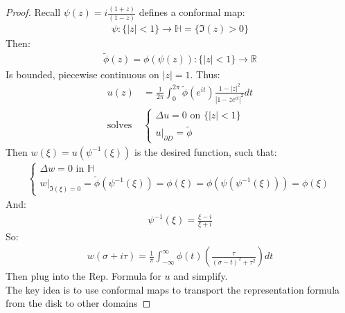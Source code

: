 \begin{proof}
    Recall $\psi (z) = i\frac{(1 +z)}{(1 - z)}$ defines a conformal map:
    \begin{align}
        \psi: \{|z| < 1\} \to \mathbb{H} = \{\Im (z) > 0\}
    \end{align}
    Then:
    \begin{align}
        \tilde{\phi}(z) = \phi(\psi(z)) : \{|z| < 1\} \to \mathbb{R}
    \end{align}
    Is bounded, piecewise continuous on $|z| = 1$. Thus:
    \begin{align*}
        u(z)           & = \frac{1}{2\pi}\int_{0}^{2\pi}\tilde{\phi}(e^{it})\frac{1 - |z|^2}{|1 - \overline{z}e^{it}|^2}dt \\
        \text{solves } & \begin{cases}
                             \Delta u = 0 \text{ on } \{|z| < 1\} \\
                             u|_{\partial D} = \tilde{\phi}
                         \end{cases}
    \end{align*}
    Then $w(\xi) = u(\psi^{-1}(\xi))$ is the desired function, such that:
    \begin{align}
        \begin{cases}
            \Delta w = 0 \text{ in } \mathbb{H} \\
            w|_{\Im (\xi) = 0} = \tilde{\phi}(\psi^{-1}(\xi)) = \phi(\xi) = \phi(\psi(\psi^{-1}(\xi))) = \phi(\xi)
        \end{cases}
    \end{align}
    And:
    \begin{align}
        \psi^{-1}(\xi) = \frac{\xi - i}{\xi + i}
    \end{align}
    So:
    \begin{align}
        w(\sigma + i\tau) = \frac{1}{\pi}\int_{-\infty}^{\infty}\phi(t)\left( \frac{\tau}{(\sigma - t)^2 + \tau^2} \right)dt
    \end{align}
    Then plug into the Rep. Formula for $u$ and simplify.\\
    The key idea is to use conformal maps to transport the representation formula from the disk to other domains
\end{proof}